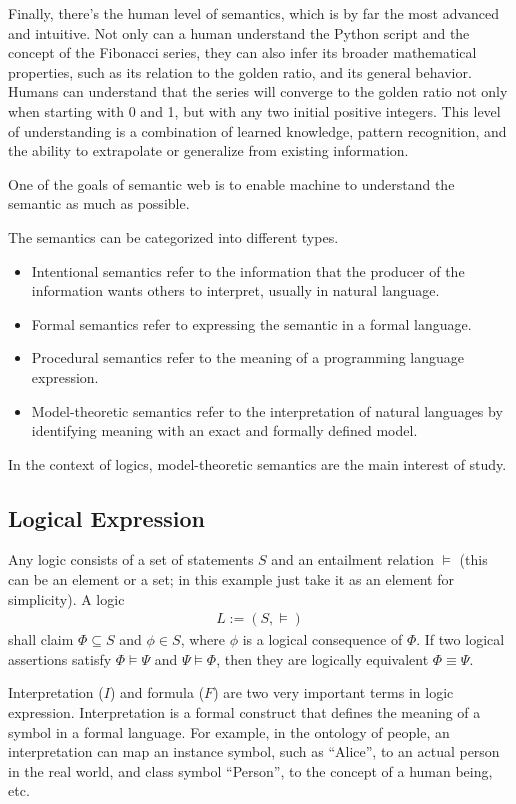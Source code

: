Finally, there's the human level of semantics, which is by far the most advanced and intuitive. Not only can a human understand the Python script and the concept of the Fibonacci series, they can also infer its broader mathematical properties, such as its relation to the golden ratio, and its general behavior. Humans can understand that the series will converge to the golden ratio not only when starting with 0 and 1, but with any two initial positive integers. This level of understanding is a combination of learned knowledge, pattern recognition, and the ability to extrapolate or generalize from existing information.

One of the goals of semantic web is to enable machine to understand the semantic as much as possible.

The semantics can be categorized into different types.
\begin{itemize}
  \item Intentional semantics refer to the information that the producer of the information wants others to interpret, usually in natural language.
  \item Formal semantics refer to expressing the semantic in a formal language.
  \item Procedural semantics refer to the meaning of a programming language expression.
  \item Model-theoretic semantics refer to the interpretation of natural languages by identifying meaning with an exact and formally defined model.
\end{itemize}
In the context of logics, model-theoretic semantics are the main interest of study.

\subsection{Logical Expression}

Any logic consists of a set of statements $S$ and an entailment relation $\vDash$ (this can be an element or a set; in this example just take it as an element for simplicity). A logic
\begin{eqnarray}
L:= (S, \vDash) \nonumber
\end{eqnarray}
shall claim $\Phi\subseteq S$ and $\phi \in S$, where $\phi$ is a logical consequence of $\Phi$. If two logical assertions satisfy $\Phi \vDash \Psi$ and $\Psi \vDash \Phi$, then they are logically equivalent $\Phi \equiv \Psi$.

Interpretation ($I$) and formula ($F$) are two very important terms in logic expression. Interpretation is a formal construct that defines the meaning of a symbol in a formal language. For example, in the ontology of people, an interpretation can map an instance symbol, such as ``Alice'', to an actual person in the real world, and class symbol ``Person'', to the concept of a human being, etc.

